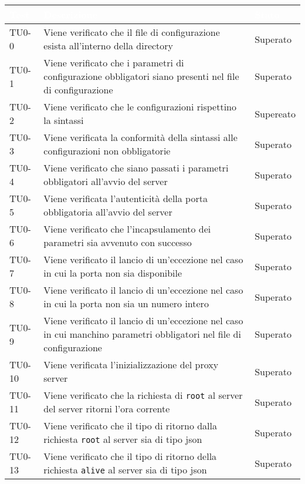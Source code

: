 \begin{longtable}{|C{.15\textwidth}|m{.65\textwidth}|C{.20\textwidth}|}
\hline
{}\textbf{\textcolor{white}{Test}}  & \textbf{\textcolor{white}{Descrizione}} & \textbf{\textcolor{white}{Stato}}\\
\hline \hline
\endhead

TU0-0 & Viene verificato che il file di configurazione esista all'interno della directory & Superato\\
\hline 
{} TU0-1 & Viene verificato che i parametri di configurazione obbligatori siano presenti nel file di configurazione & Superato \\ 
\hline
TU0-2 & Viene verificato che le configurazioni rispettino la sintassi & Supereato \\ 
\hline
{} TU0-3 & Viene verificata la conformità della sintassi alle configurazioni non obbligatorie & Superato \\ 
\hline 
TU0-4 & Viene verificato che siano passati i parametri obbligatori all'avvio del server & Superato \\ 
\hline
{} TU0-5 & Viene verificata l'autenticità della porta obbligatoria all'avvio del server & Superato \\ 
\hline
TU0-6 & Viene verificato  che l'incapsulamento dei parametri sia avvenuto con successo & Superato \\
\hline 
{} TU0-7 & Viene verificato il lancio di un'eccezione nel caso in cui la porta non sia disponibile & Superato \\ 
\hline 
TU0-8 & Viene verificato il lancio di un'eccezione nel caso in cui la porta non sia un numero intero & Superato \\
\hline
{}  TU0-9 & Viene verificato il lancio di un'eccezione nel caso in cui manchino parametri obbligatori nel file di configurazione & Superato \\ 
\hline
TU0-10 & Viene verificata l'inizializzazione del proxy server & Superato \\ 
\hline 
{} TU0-11 & Viene verificato che la richiesta di \texttt{root} al server del server ritorni l'ora corrente & Superato \\ 
\hline
TU0-12 & Viene verificato che il tipo di ritorno dalla richiesta \texttt{root} al server sia di tipo json & Superato \\ 
\hline 
TU0-13 & Viene verificato che il tipo di ritorno della richiesta \texttt{alive} al server sia di tipo json & Superato \\ 

\end{longtable}
